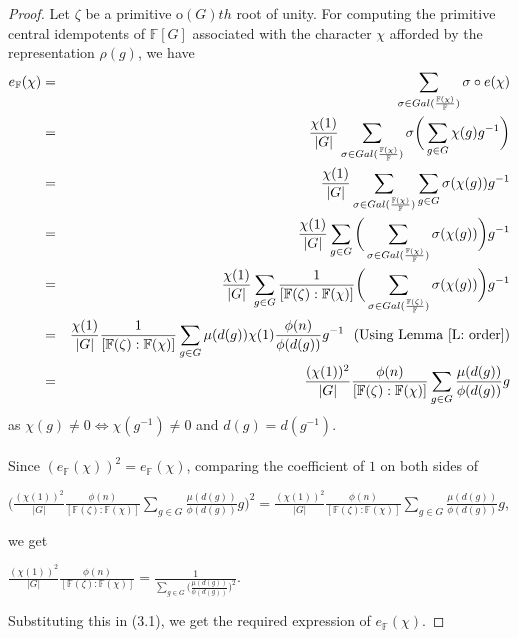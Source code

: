 \documentclass[12pt, reqno]{amsart}
\numberwithin{equation}{section}
\theoremstyle{definition}
\theoremstyle{remark}
\theoremstyle{plain}
\begin{document}
\begin{proof}
Let $\zeta$ be a primitive $\text{o}(G)th$ root of unity. For computing the primitive central idempotents of $\mathbb{F}[G]$ associated with the character $\chi$ afforded by the representation $\rho(g)$, we have
\begin{eqnarray}\nonumber
  e_{\mathbb{F}}(\chi) &=& \sum_{\sigma \in Gal(\frac{\mathbb{F}(\chi)}{\mathbb{F}})}\sigma \circ e(\chi) \\\nonumber
   &=& \frac{\chi(1)}{|G|}\sum_{\sigma \in Gal(\frac{\mathbb{F}(\chi)}{\mathbb{F}})}\sigma\bigg(\sum_{g\in G}\chi(g)g^{-1}\bigg) \\\nonumber
   &=&  \frac{\chi(1)}{|G|}\sum_{\sigma \in Gal(\frac{\mathbb{F}(\chi)}{\mathbb{F}})}\sum_{g\in G}\sigma(\chi(g))g^{-1} \\\nonumber
   &=&\frac{\chi(1)}{|G|}\sum_{g\in G}\bigg(\sum_{\sigma \in Gal(\frac{\mathbb{F}(\chi)}{\mathbb{F}})}\sigma(\chi(g))\bigg)g^{-1}  \\\nonumber
   &=&\frac{\chi(1)}{|G|}\sum_{g\in G}\frac{1}{[\mathbb{F}(\zeta):\mathbb{F}(\chi)]}\bigg(\sum_{\sigma \in Gal(\frac{\mathbb{F}(\zeta)}{\mathbb{F}})}\sigma(\chi(g))\bigg)g^{-1}  \\\nonumber
   &=& \frac{\chi(1)}{|G|}\frac{1}{[\mathbb{F}(\zeta):\mathbb{F}(\chi)]}\sum_{g\in G}\mu(d(g))\chi(1)\frac{\phi(n)}{\phi(d(g))}g^{-1}\ \ (\text{Using Lemma \ref{L: order}}) \\
   &=&  \frac{(\chi(1))^2}{|G|}\frac{\phi(n)}{[\mathbb{F}(\zeta):\mathbb{F}(\chi)]}\sum_{g\in G}\frac{\mu(d(g))}{\phi(d(g))}g
\end{eqnarray}
as $\chi(g)\neq 0\Leftrightarrow \chi(g^{-1})\neq 0$ and $d(g) = d(g^{-1})$.\\\\
Since $(e_{\mathbb{F}}(\chi))^2=e_{\mathbb{F}}(\chi)$, comparing the coefficient of $1$ on both sides of  
\begin{center}
  $\bigg(\frac{(\chi(1))^2}{|G|}\frac{\phi(n)}{[\mathbb{F}(\zeta):\mathbb{F}(\chi)]}\sum_{g\in G}\frac{\mu(d(g))}{\phi(d(g))}g\bigg)^2 =  \frac{(\chi(1))^2}{|G|}\frac{\phi(n)}{[\mathbb{F}(\zeta):\mathbb{F}(\chi)]}\sum_{g\in G}\frac{\mu(d(g))}{\phi(d(g))}g$,
\end{center}
we get
\begin{center}
  $\frac{(\chi(1))^2}{|G|}\frac{\phi(n)}{[\mathbb{F}(\zeta):\mathbb{F}(\chi)]} = \frac{1}{\sum_{g\in G}\bigg(\frac{\mu(d(g))}{\phi(d(g))}\bigg)^2}.$
\end{center}
Substituting this in (3.1), we get the required expression of $e_\mathbb{F}(\chi)$.
\end{proof}\smallskip
\end{document}
